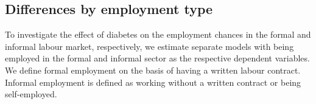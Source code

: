 \FloatBarrier

\subsection{Differences by employment type}



To investigate the effect of diabetes on the employment chances in
the formal and informal labour market, respectively, we estimate separate
models with being employed in the formal and informal sector as the
respective dependent variables. We define formal employment on the
basis of having a written labour contract. Informal employment is
defined as working without a written contract or being self-employed. 

\begin{table}[h]
\protect\caption{\label{tab:Effect-of-diabetes-formal-informal-probit}Impact of diabetes
on employment probabilities by employment status (probit)}


\begin{center}
\end{center}
\end{table}


